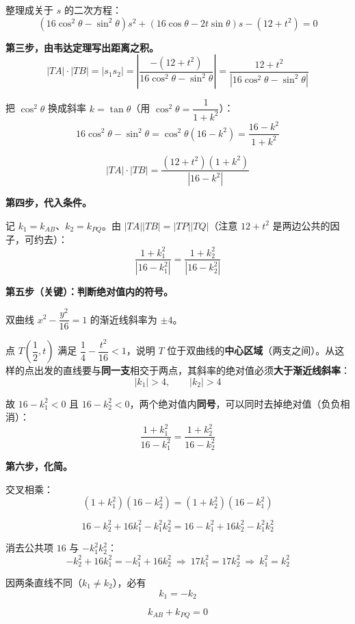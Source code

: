 \begin{answer}
整理成关于 $s$ 的二次方程：
\nopagebreak[4]
\[\left(16\cos^{2}\theta-\sin^{2}\theta\right)s^{2}+\left(16\cos\theta-2t\sin\theta\right)s-\left(12+t^{2}\right)=0\]

\textbf{第三步，由韦达定理写出距离之积。}
\nopagebreak[4]
\[|TA|\cdot|TB|=\left|s_1s_2\right|=\left|\frac{-\left(12+t^{2}\right)}{16\cos^{2}\theta-\sin^{2}\theta}\right|=\frac{12+t^{2}}{\left|16\cos^{2}\theta-\sin^{2}\theta\right|}\]

把 $\cos^2\theta$ 换成斜率 $k=\tan\theta$（用 $\cos^{2}\theta=\dfrac1{1+k^{2}}$）：
\nopagebreak[4]
\[16\cos^{2}\theta-\sin^{2}\theta=\cos^{2}\theta\left(16-k^{2}\right)=\frac{16-k^{2}}{1+k^{2}}\]

\nopagebreak[4]
\[|TA|\cdot|TB|=\frac{\left(12+t^{2}\right)\left(1+k^{2}\right)}{\left|16-k^{2}\right|}\]

\textbf{第四步，代入条件。}

记 $k_1=k_{AB}$、$k_2=k_{PQ}$。由 $|TA||TB|=|TP||TQ|$（注意 $12+t^{2}$ 是两边公共的因子，可约去）：
\nopagebreak[4]
\[\frac{1+k_1^{2}}{\left|16-k_1^{2}\right|}=\frac{1+k_2^{2}}{\left|16-k_2^{2}\right|}\]

\textbf{第五步（关键）：判断绝对值内的符号。}

双曲线 $x^{2}-\dfrac{y^{2}}{16}=1$ 的渐近线斜率为 $\pm4$。

点 $T\left(\dfrac12,t\right)$ 满足 $\dfrac14-\dfrac{t^{2}}{16}<1$，说明 $T$ 位于双曲线的\textbf{中心区域}（两支之间）。从这样的点出发的直线要与\textbf{同一支}相交于两点，其斜率的绝对值必须\textbf{大于渐近线斜率}：
\nopagebreak[4]
\[\left|k_1\right|>4,\qquad \left|k_2\right|>4\]

故 $16-k_1^{2}<0$ 且 $16-k_2^{2}<0$，两个绝对值内\textbf{同号}，可以同时去掉绝对值（负负相消）：
\nopagebreak[4]
\[\frac{1+k_1^{2}}{16-k_1^{2}}=\frac{1+k_2^{2}}{16-k_2^{2}}\]

\textbf{第六步，化简。}

交叉相乘：
\nopagebreak[4]
\[\left(1+k_1^{2}\right)\left(16-k_2^{2}\right)=\left(1+k_2^{2}\right)\left(16-k_1^{2}\right)\]

\nopagebreak[4]
\[16-k_2^{2}+16k_1^{2}-k_1^{2}k_2^{2}=16-k_1^{2}+16k_2^{2}-k_1^{2}k_2^{2}\]

消去公共项 $16$ 与 $-k_1^{2}k_2^{2}$：
\nopagebreak[4]
\[-k_2^{2}+16k_1^{2}=-k_1^{2}+16k_2^{2}\ \Longrightarrow\ 17k_1^{2}=17k_2^{2}\ \Longrightarrow\ k_1^{2}=k_2^{2}\]

因两条直线不同（$k_1\ne k_2$），必有
\nopagebreak[4]
\[k_1=-k_2\]

\nopagebreak[4]
\[k_{AB}+k_{PQ}=0\]


\end{answer}
